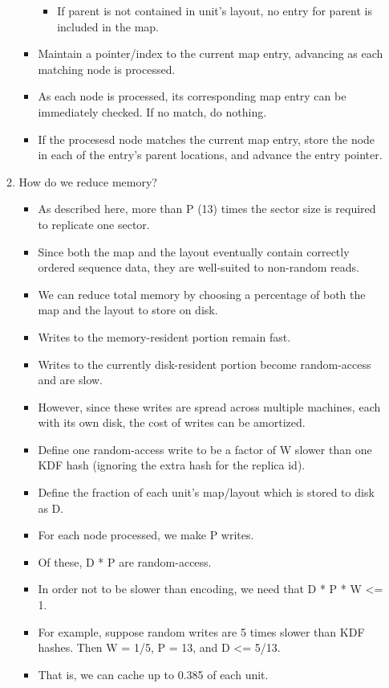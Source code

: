 \documentclass[11pt]{article}
\begin{document}
\begin{enumerate}
\begin{enumerate}
\begin{itemize}
\begin{itemize}
\item If parent is not contained in unit's layout, no entry for parent is included in the map.
\end{itemize}
\item Maintain a pointer/index to the current map entry, advancing as each matching node is processed.
\item As each node is processed, its corresponding map entry can be immediately checked. If no match, do nothing.
\item If the procesesd node matches the current map entry, store the node in each of the entry's parent locations, and advance the entry pointer.
\end{itemize}
\item How do we reduce memory?
\label{sec-1-3-1-3-3}
\begin{itemize}
\item As described here, more than P (13) times the sector size is required to replicate one sector.
\item Since both the map and the layout eventually contain correctly ordered sequence data, they are well-suited to non-random reads.
\item We can reduce total memory by choosing a percentage of both the map and the layout to store on disk.
\item Writes to the memory-resident portion remain fast.
\item Writes to the currently disk-resident portion become random-access and are slow.
\item However, since these writes are spread across multiple machines, each with its own disk, the cost of writes can be amortized.
\item Define one random-access write to be a factor of W slower than one KDF hash (ignoring the extra hash for the replica id).
\item Define the fraction of each unit's map/layout which is stored to disk as D.
\item For each node processed, we make P writes.
\item Of these, D * P are random-access.
\item In order not to be slower than encoding, we need that D * P * W <= 1.
\item For example, suppose random writes are 5 times slower than KDF hashes. Then W = 1/5, P = 13, and D <= 5/13.
\item That is, we can cache up to 0.385 of each unit.

\end{itemize}
\end{enumerate}
\end{enumerate}
\end{document}
